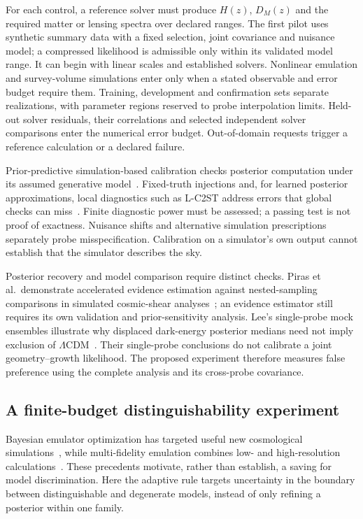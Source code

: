For each control, a reference solver must produce $H(z)$, $D_M(z)$ and the required matter or lensing spectra over declared ranges.  The first pilot uses synthetic summary data with a fixed selection, joint covariance and nuisance model; a compressed likelihood is admissible only within its validated model range.  It can begin with linear scales and established solvers.  Nonlinear emulation and survey-volume simulations enter only when a stated observable and error budget require them.  Training, development and confirmation sets separate realizations, with parameter regions reserved to probe interpolation limits.  Held-out solver residuals, their correlations and selected independent solver comparisons enter the numerical error budget.  Out-of-domain requests trigger a reference calculation or a declared failure.

Prior-predictive simulation-based calibration checks posterior computation under its assumed generative model~\cite{Talts:2018}.  Fixed-truth injections and, for learned posterior approximations, local diagnostics such as L-C2ST address errors that global checks can miss~\cite{Linhart:2023}.  Finite diagnostic power must be assessed; a passing test is not proof of exactness.  Nuisance shifts and alternative simulation prescriptions separately probe misspecification.  Calibration on a simulator's own output cannot establish that the simulator describes the sky.

Posterior recovery and model comparison require distinct checks.  Piras et al.\ demonstrate accelerated evidence estimation against nested-sampling comparisons in simulated cosmic-shear analyses~\cite{Piras:2024}; an evidence estimator still requires its own validation and prior-sensitivity analysis.  Lee's single-probe mock ensembles illustrate why displaced dark-energy posterior medians need not imply exclusion of $\Lambda$CDM~\cite{Lee:2026Null}.  Their single-probe conclusions do not calibrate a joint geometry--growth likelihood.  The proposed experiment therefore measures false preference using the complete analysis and its cross-probe covariance.

\subsection{A finite-budget distinguishability experiment}

Bayesian emulator optimization has targeted useful new cosmological simulations~\cite{Rogers:2019}, while multi-fidelity emulation combines low- and high-resolution calculations~\cite{Ho:2022}.  These precedents motivate, rather than establish, a saving for model discrimination.  Here the adaptive rule targets uncertainty in the boundary between distinguishable and degenerate models, instead of only refining a posterior within one family.

